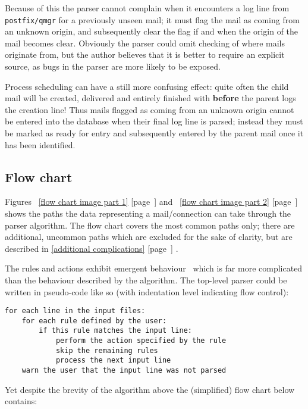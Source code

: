 \documentclass[a4paper,12pt,draft]{article}
\newcommand{\refwithpage}[1]{%
    \empty{}\ref{#1} [page~\pageref{#1}]%
}
\newcommand{\sectionref}[1]{%
    \textsection{}\refwithpage{#1}%
}
\newcommand{\daemon}[1]{%
    \texttt{postfix/#1}%
}
\begin{document}
Because of this the parser cannot complain when it encounters a log line
from \daemon{qmgr} for a previously unseen mail; it must flag the mail as
coming from an unknown origin, and subsequently clear the flag if and when
the origin of the mail becomes clear.  Obviously the parser could omit
checking of where mails originate from, but the author believes that it is
better to require an explicit source, as bugs in the parser are more likely
to be exposed.

Process scheduling can have a still more confusing effect: quite often the
child mail will be created, delivered and entirely finished with
\textbf{before} the parent logs the creation line!  Thus mails flagged as
coming from an unknown origin cannot be entered into the database when
their final log line is parsed; instead they must be marked as ready for
entry and subsequently entered by the parent mail once it has been
identified.

\subsection{Flow chart}

\label{flow-chart}

Figures~\refwithpage{flow chart image part 1} and~\refwithpage{flow chart
image part 2} shows the paths the data representing a mail/connection can
take through the parser algorithm.  The flow chart covers the most common
paths only; there are additional, uncommon paths which are excluded for the
sake of clarity, but are described in \sectionref{additional
complications}.

The rules and actions exhibit emergent behaviour~\cite{Wikipedia-Emergence}
which is far more complicated than the behaviour described by the
algorithm.  The top-level parser could be written in pseudo-code like so
(with indentation level indicating flow control):

\begin{verbatim}
for each line in the input files:
    for each rule defined by the user:
        if this rule matches the input line:
            perform the action specified by the rule
            skip the remaining rules
            process the next input line
    warn the user that the input line was not parsed
\end{verbatim}

Yet despite the brevity of the algorithm above the (simplified) flow chart
below contains:
\end{document}
